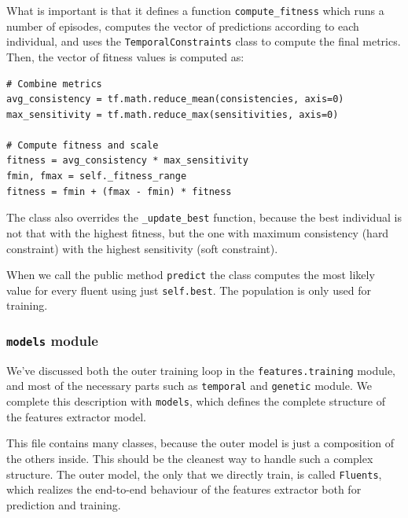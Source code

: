What is important is that it defines a function \verb|compute_fitness| which
runs a number of episodes, computes the vector of predictions according to
each individual, and uses the \texttt{TemporalConstraints} class to compute
the final metrics. Then, the vector of fitness values is computed as:
\begin{verbatim}
# Combine metrics
avg_consistency = tf.math.reduce_mean(consistencies, axis=0)
max_sensitivity = tf.math.reduce_max(sensitivities, axis=0)

# Compute fitness and scale
fitness = avg_consistency * max_sensitivity
fmin, fmax = self._fitness_range
fitness = fmin + (fmax - fmin) * fitness
\end{verbatim}

The class also overrides the \verb|_update_best| function, because the best
individual is not that with the highest fitness, but the one with maximum
consistency (hard constraint) with the highest sensitivity (soft constraint).

When we call the public method \texttt{predict} the class computes the most
likely value for every fluent using just \verb|self.best|. The population is
only used for training.


\subsubsection*{\texttt{models} module}

We've discussed both the outer training loop in the \verb|features.training|
module, and most of the necessary parts such as \texttt{temporal} and
\texttt{genetic} module. We complete this description with \texttt{models},
which defines the complete structure of the features extractor model.

This file contains many classes, because the outer model is just a composition
of the others inside. This should be the cleanest way to handle such a complex
structure. The outer model, the only that we directly train, is called
\texttt{Fluents}, which realizes the end-to-end behaviour of the features
extractor both for prediction and training.

